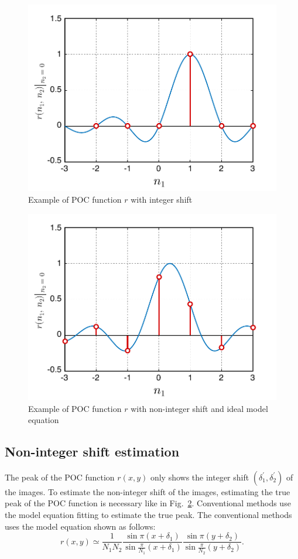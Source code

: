 \documentclass[a4paper,10pt,dvipdfmx,twocolumn,english]{jsarticle}
\begin{document}
\begin{figure}[t]
   \centering
   \includegraphics[width=.8\hsize]{figure/fig2.pdf}
   \caption{Example of POC function $r$ with integer shift}
   \label{POCpeak_int}
\end{figure}

\begin{figure}[t]
   \centering
   \includegraphics[width=.8\hsize]{figure/fig4.pdf}
   \caption{Example of POC function $r$ with non-integer shift and ideal model equation}
   \label{POCpeak_nonint}
\end{figure}

\subsection{Non-integer shift estimation}

The peak of the POC function $r(x,y)$ only shows the integer shift
    $(\delta^\prime_1,\delta_2^\prime)$ of the images. 
To estimate the non-integer shift of the images, 
   estimating the true peak of the POC function is necessary like in Fig.~\ref{POCpeak_nonint}. 
Conventional methods use the model equation fitting to estimate the true peak. 
   The conventional methods \cite{takita2003high,dctspc,ito2009multiple}
       uses the model equation shown as follows:
   \begin{equation}
      \label{eq:POC fitting model}
      r(x,y) \simeq \frac{1}{N_1N_2} 
         \frac{\sin{\pi(x+\delta_1)}}{\sin{\frac{\pi}{N_1}(x+\delta_1)}} 
      \frac{\sin{\pi(y+\delta_2)}}{\sin{\frac{\pi}{N_2}(y+\delta_2)}}.
   \end{equation}
\end{document}
